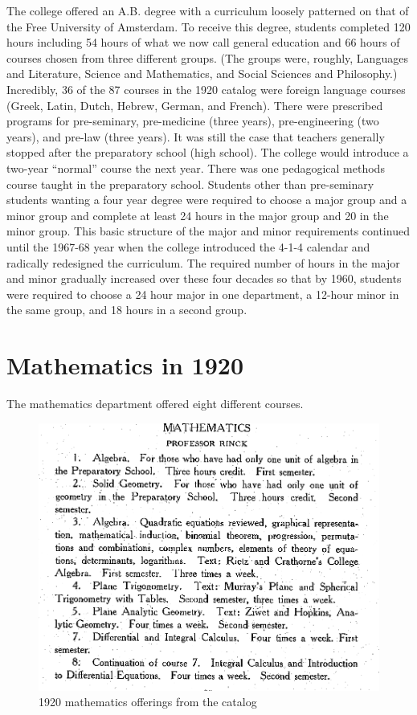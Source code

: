 \documentclass[
]{book}
\begin{document}
The college offered an A.B. degree with a curriculum loosely patterned on that of the Free University of Amsterdam.
To receive this degree, students completed 120 hours including 54 hours of what we now call general education and 66 hours of courses chosen from three different groups. (The groups were, roughly, Languages and Literature, Science and Mathematics, and Social Sciences and Philosophy.) Incredibly, 36 of the 87 courses in the 1920 catalog were foreign language courses (Greek, Latin, Dutch, Hebrew, German, and French).
There were prescribed programs for pre-seminary, pre-medicine (three years), pre-engineering (two years), and pre-law (three years). It was still the case that teachers generally stopped after the preparatory school (high school). The college would introduce a two-year ``normal'' course the next year. There was one pedagogical methods course taught in the preparatory school. Students other than pre-seminary students wanting a four year degree were required to choose a major group and a minor group and complete at least 24 hours in the major group and 20 in the minor group. This basic structure of the major and minor requirements continued until the 1967-68 year when the college introduced the 4-1-4 calendar and radically redesigned the curriculum. The required number of hours in the major and minor gradually increased over these four decades so that by 1960, students were required to choose a 24 hour major in one department, a 12-hour minor in the same group, and 18 hours in a second group.

\hypertarget{mathematics-in-1920}{%
\section{Mathematics in 1920}\label{mathematics-in-1920}}

The mathematics department offered eight different courses.

\begin{figure}

{\centering \includegraphics[width=12.43in]{images/1920Program} 

}

\caption{1920 mathematics offerings from the catalog}\label{fig:1920curr}
\end{figure}
\end{document}
